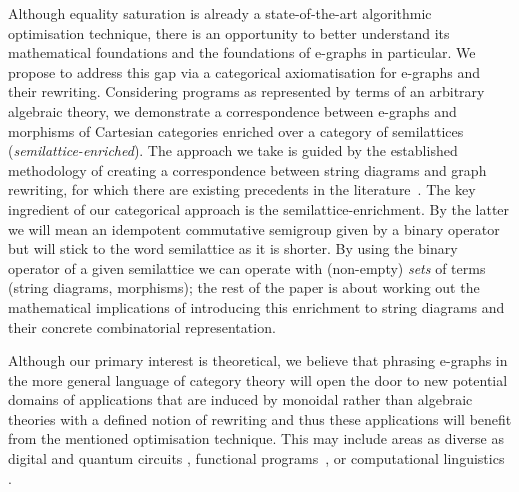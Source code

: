 Although equality saturation is already a state-of-the-art algorithmic optimisation technique, there is an opportunity to better understand its mathematical foundations and the foundations of e-graphs in particular.
We propose to address this gap via a categorical axiomatisation for e-graphs and their rewriting.
Considering programs as represented by terms of an arbitrary algebraic theory, we demonstrate a correspondence between e-graphs and morphisms of Cartesian categories enriched over a category of semilattices (\textit{semilattice-enriched}).
The approach we take is guided by the established methodology of creating a correspondence between string diagrams and graph rewriting, for which there are existing precedents in the literature~\cite{bonchi_string_2022-1,bonchi_string_2022-2,bonchi_string_2022-3,fscd,ghica-zanassi2023string}.
The key ingredient of our categorical approach is the semilattice-enrichment.
By the latter we will mean an idempotent commutative semigroup given by a binary operator but will stick to the word semilattice as it is shorter.
By using the binary operator of a given semilattice we can operate with (non-empty) \textit{sets} of terms (string diagrams, morphisms); the rest of the paper is about working out the mathematical implications of introducing this enrichment to string diagrams and their concrete combinatorial representation.

Although our primary interest is theoretical, we believe that phrasing e-graphs in the more general language of category theory will open the door to new potential domains of applications that are induced by monoidal rather than algebraic theories with a defined notion of rewriting and thus these applications will benefit from the mentioned optimisation technique.
This may include areas as diverse as digital \cite{ghica_compositional_2023} and quantum circuits
\cite{coecke_interacting_2011,ZX}, functional programs~\cite{ghica-zanassi2023string}, or computational linguistics \cite{wazni_quantum_2022,coecke_lambek_2013}.

